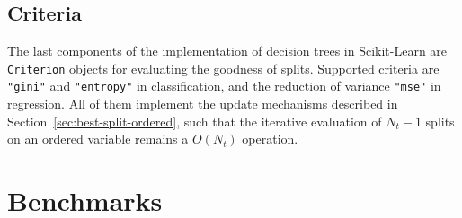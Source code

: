 \subsection{Criteria}

The last components of the implementation of decision trees in Scikit-Learn are
\texttt{Criterion} objects for evaluating the goodness of splits. Supported
criteria are \texttt{"gini"} and \texttt{"entropy"} in classification, and the
reduction of variance \texttt{"mse"} in regression. All of them implement the
update mechanisms described in Section~\ref{sec:best-split-ordered}, such that
the iterative evaluation of $N_t-1$ splits on an ordered variable remains a
$O(N_t)$ operation.


\section{Benchmarks}
\label{sec:5:benchmarks}




